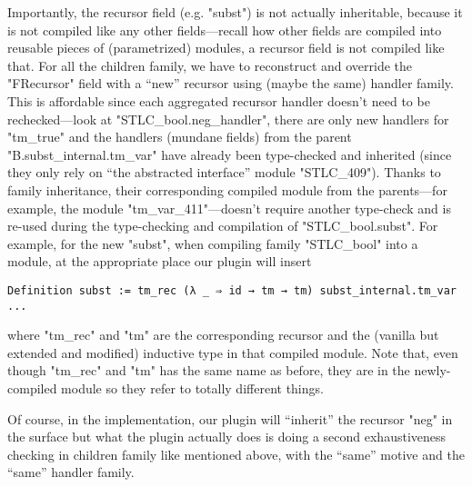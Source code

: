 Importantly, the recursor field (e.g. "subst") is not actually inheritable, because it is not compiled like any other fields---recall how other fields are compiled into reusable pieces of (parametrized) modules, a recursor field is not compiled like that. For all the children family, we have to reconstruct and override the "FRecursor" field with a ``new'' recursor using (maybe the same) handler family. This is affordable since each aggregated recursor handler doesn't need
to be rechecked---look at "STLC_bool.neg_handler", there are only  new
handlers for "tm_true" and the handlers (mundane fields) from the parent
"B.subst_internal.tm_var" have already been type-checked and
inherited (since they only rely on ``the abstracted
interface'' module "STLC_409"). 
Thanks to family inheritance, their corresponding compiled module from the parents---for example, 
the module "tm_var_411"---doesn't require another type-check and is re-used during the type-checking and compilation of "STLC_bool.subst". For example, for the new "subst", when compiling family "STLC_bool" into a module, at the appropriate place our plugin will insert
\begin{verbatim}
Definition subst := tm_rec (λ _ ⇒ id → tm → tm) subst_internal.tm_var ...
\end{verbatim}
where "tm_rec" and "tm" are the corresponding recursor and the (vanilla but extended and modified) inductive type in that compiled module. Note that, even though "tm_rec" and "tm" has the same name as before, they are in the newly-compiled module so they refer to totally different things. 





Of course, in the implementation, our plugin will ``inherit'' the
recursor "neg" in the surface 
but what the plugin actually does is doing a second exhaustiveness
checking in children family like mentioned above, with the ``same'' motive and the ``same'' handler family.



 





